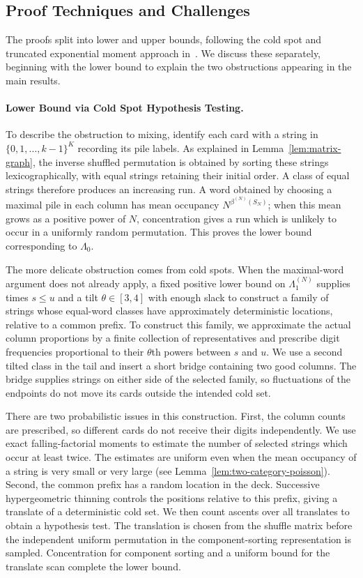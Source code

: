 \documentclass[11pt]{article}
\numberwithin{equation}{section}
\theoremstyle{definition}
\theoremstyle{remark}
\newcommand{\1}{\mathbf 1}
\begin{document}
\subsection{Proof Techniques and Challenges}

The proofs split into lower and upper bounds, following the cold spot
and truncated exponential moment approach in~\cite{SSW}. We discuss
these separately, beginning with the lower bound to explain the two
obstructions appearing in the main results.

\paragraph{Lower Bound via Cold Spot Hypothesis Testing.}
To describe the obstruction to mixing, identify each card with a string
in $\{0,1,\ldots,k-1\}^K$ recording its pile labels. As explained in
Lemma~\ref{lem:matrix-graph}, the inverse shuffled permutation is obtained
by sorting these strings lexicographically, with equal strings retaining
their initial order. A class of equal strings therefore produces an
increasing run. A word obtained by choosing a maximal pile in each column
has mean occupancy $N^{\beta^{(N)}(S_N)}$; when this mean grows as a
positive power of $N$, concentration
gives a run which is unlikely to occur in a uniformly random permutation.
This proves the lower bound corresponding to $\Lambda_0$.

The more delicate obstruction comes from cold spots. When the maximal-word
argument does not already apply, a fixed positive lower bound on
$\Lambda_1^{(N)}$ supplies times $s\le u$ and a tilt
$\theta\in[3,4]$ with enough slack to construct a family of strings
whose equal-word classes have approximately deterministic locations,
relative to a common prefix. To construct this family, we approximate
the actual column proportions by a finite collection of representatives
and prescribe digit frequencies proportional to their $\theta$th powers
between $s$ and $u$. We use a second tilted class in the tail and insert
a short bridge containing two good columns. The bridge supplies strings
on either side of the selected family, so fluctuations of the endpoints
do not move its cards outside the intended cold set.

There are two probabilistic issues in this construction. First, the
column counts are prescribed, so different cards do not receive their
digits independently. We use exact falling-factorial moments to estimate
the number of selected strings which occur at least twice. The estimates
are uniform even when the mean occupancy of a string is very small or
very large (see Lemma~\ref{lem:two-category-poisson}). Second, the common
prefix has a random location in the deck. Successive hypergeometric
thinning controls the positions relative to this prefix, giving a
translate of a deterministic cold set. We then count ascents over all
translates to obtain a hypothesis test. The translation is chosen from
the shuffle matrix before the independent uniform permutation in the
component-sorting representation is sampled. Concentration for component
sorting and a uniform bound for the translate scan complete the lower
bound.
\end{document}
